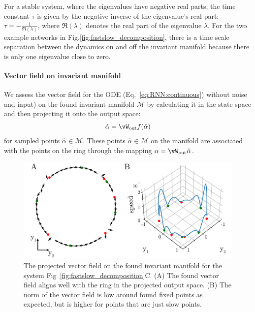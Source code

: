 \documentclass{article} %
\newcounter{ct}
\newcommand{\wout}{\vW_{\text{out}}}
\newcommand{\manifold}{\mathcal{M}}
\theoremstyle{definition}
\theoremstyle{remark}
\begin{document}

For a stable system, where the eigenvalues have negative real parts, the time constant \(\tau\) is given by the negative inverse of the eigenvalue's real part: \(\tau = -\frac{1}{\Re(\lambda)}\),
where \(\Re(\lambda)\) denotes the real part of the eigenvalue \(\lambda\).
For the two example networks in Fig.\ref{fig:fastslow_decomposition}, there is a time scale separation between the dynamics on and off the invariant manifold because there is only one eigenvalue close to zero.

 \paragraph{Vector field on invariant manifold}\label{sec:supp:vf}

 We assess the vector field for the ODE (Eq.~\ref{eq:RNN:continuous}) without noise and input) on the found invariant manifold \(\manifold\) by calculating it in the state space
 and then projecting it onto the output space:
 \begin{equation}
\dot \alpha =  \wout f(\hat \alpha) %
\end{equation}
for sampled points \(\hat \alpha\in \manifold\).
These points \(\hat \alpha\in \manifold\) on the manifold are associated with the points on the ring through the mapping \(\alpha = \wout\hat\alpha\).


 \begin{figure}[tbhp]
     \centering
    \includegraphics[width=\textwidth]{vf_on_ring}
       \caption{The projected vector field on the found invariant manifold for the system Fig~\ref{fig:fastslow_decomposition}C.
       (A) The found vector field aligns well with the ring in the projected output space.
       (B) The norm of the vector field is low around found fixed points as expected, but is higher for points that are just slow points.
       }\label{fig:vf_on_ring}
\end{figure}
\end{document}
